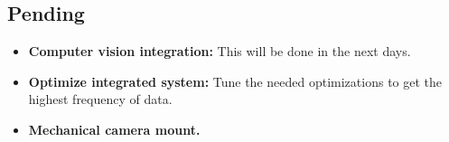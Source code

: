 \subsection{Pending}

\begin{itemize}
	\item \textbf{Computer vision integration:} This will be done in the next days.
	\item \textbf{Optimize integrated system:} Tune the needed optimizations to get the highest frequency of data.
	\item \textbf{Mechanical camera mount.}
\end{itemize}
